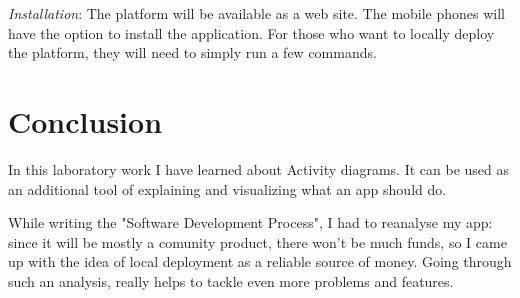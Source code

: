 \documentclass{article}
\begin{document}
		\textit{Installation}: The platform will be available as a web site. The mobile phones will have the option to install the application. For those who want to locally deploy the platform, they will need to simply run a few commands.

	\section{Conclusion}
		In this laboratory work I have learned about Activity diagrams. It can be used as an additional tool of explaining and visualizing what an app should do.

		While writing the "Software Development Process", I had to reanalyse my app: since it will be mostly a comunity product, there won't be much funds, so I came up with the idea of local deployment as a reliable source of money. Going through such an analysis, really helps to tackle even more problems and features.
\end{document}
